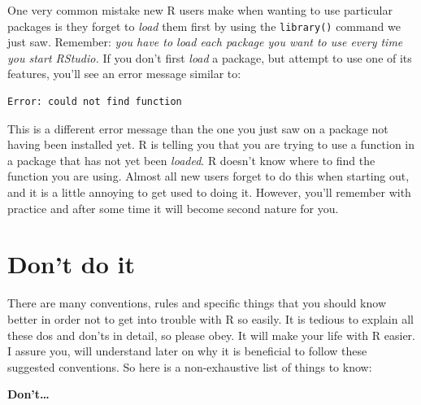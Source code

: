 \documentclass[
  12pt,
  oneside]{book}
\theoremstyle{definition}
\theoremstyle{definition}
\theoremstyle{definition}
\theoremstyle{definition}
\theoremstyle{remark}
\begin{document}
One very common mistake new R users make when wanting to use particular packages is they forget to \emph{load} them first by using the \texttt{library()} command we just saw. Remember: \emph{you have to load each package you want to use every time you start RStudio.} If you don't first \emph{load} a package, but attempt to use one of its features, you'll see an error message similar to:

\begin{verbatim}
Error: could not find function
\end{verbatim}

This is a different error message than the one you just saw on a package not having been installed yet. R is telling you that you are trying to use a function in a package that has not yet been \emph{loaded}. R doesn't know where to find the function you are using. Almost all new users forget to do this when starting out, and it is a little annoying to get used to doing it. However, you'll remember with practice and after some time it will become second nature for you.

\hypertarget{dont-do-it}{%
\section{Don't do it}\label{dont-do-it}}

There are many conventions, rules and specific things that you should know better in order not to get into trouble with R so easily. It is tedious to explain all these dos and don'ts in detail, so please obey. It will make your life with R easier. I assure you, will understand later on why it is beneficial to follow these suggested conventions. So here is a non-exhaustive list of things to know:

\textbf{Don't\ldots{}}
\end{document}
